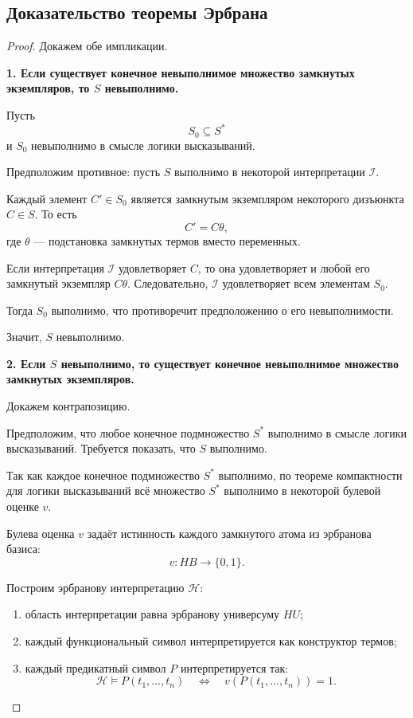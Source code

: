 \documentclass[12pt,a4paper]{article}
\begin{document}
\subsection{Доказательство теоремы Эрбрана}

\begin{proof}
Докажем обе импликации.

\textbf{1. Если существует конечное невыполнимое множество замкнутых экземпляров, то $S$ невыполнимо.}

Пусть
$$
S_0 \subseteq S^*
$$
и $S_0$ невыполнимо в смысле логики высказываний.

Предположим противное: пусть $S$ выполнимо в некоторой интерпретации $\mathcal{I}$.

Каждый элемент $C' \in S_0$ является замкнутым экземпляром некоторого дизъюнкта $C \in S$. То есть
$$
C' = C\theta,
$$
где $\theta$ --- подстановка замкнутых термов вместо переменных.

Если интерпретация $\mathcal{I}$ удовлетворяет $C$, то она удовлетворяет и любой его замкнутый экземпляр $C\theta$. Следовательно, $\mathcal{I}$ удовлетворяет всем элементам $S_0$.

Тогда $S_0$ выполнимо, что противоречит предположению о его невыполнимости.

Значит, $S$ невыполнимо.

\medskip

\textbf{2. Если $S$ невыполнимо, то существует конечное невыполнимое множество замкнутых экземпляров.}

Докажем контрапозицию.

Предположим, что любое конечное подмножество $S^*$ выполнимо в смысле логики высказываний. Требуется показать, что $S$ выполнимо.

Так как каждое конечное подмножество $S^*$ выполнимо, по теореме компактности для логики высказываний всё множество $S^*$ выполнимо в некоторой булевой оценке $v$.

Булева оценка $v$ задаёт истинность каждого замкнутого атома из эрбранова базиса:
$$
v : HB \to \{0,1\}.
$$

Построим эрбранову интерпретацию $\mathcal{H}$:
\begin{enumerate}
    \item область интерпретации равна эрбранову универсуму $HU$;
    \item каждый функциональный символ интерпретируется как конструктор термов;
    \item каждый предикатный символ $P$ интерпретируется так:
    $$
    \mathcal{H} \models P(t_1,\dots,t_n)
    \quad\Longleftrightarrow\quad
    v(P(t_1,\dots,t_n)) = 1.
    $$
\end{enumerate}


\end{proof}
\end{document}
